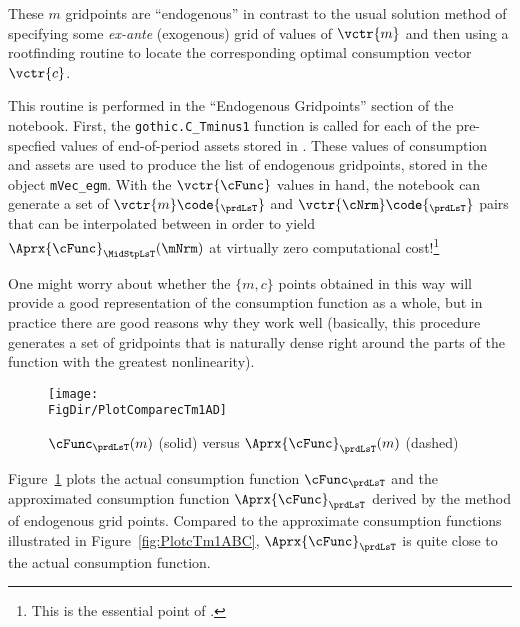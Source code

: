 \documentclass[\econtexRoot/SolvingMicroDSOPs]{subfiles}
\begin{document}

These $m$ gridpoints are ``endogenous'' in contrast to the usual solution method of specifying some \textit{ex-ante} (exogenous) grid of values of $\vctr{m}$ and then using a rootfinding routine to locate the corresponding optimal consumption vector $\vctr{c}$.


This routine is performed in the ``Endogenous Gridpoints'' section of the notebook. First, the \texttt{gothic.C\_Tminus1} function is called for each of the pre-specfied values of end-of-period assets stored in . These values of consumption and assets are used to produce the list of endogenous gridpoints, stored in the object \texttt{mVec\_egm}. With the $\vctr{\cFunc}$ values in hand, the notebook can generate a set of $\vctr{m}\code{_{\prdLsT}}$ and ${\vctr{\cNrm}\code{_{\prdLsT}}}$ pairs that can be interpolated between in order to yield $\Aprx{\cFunc}_{\MidStpLsT}(\mNrm)$ at virtually zero computational cost!\footnote{This is the essential point of \cite{carrollEGM}.} %

\hypertarget{PlotComparecTm1AD}{}
One might worry about whether the $\{{m},c\}$ points obtained in this way will provide a good representation of the consumption function as a whole, but in practice there are good reasons why they work well (basically, this procedure generates a set of gridpoints that is naturally dense right around the parts of the function with the greatest nonlinearity).
\begin{figure}
  \centerline{\texttt{[image: \\FigDir/PlotComparecTm1AD]}}
  \caption{$\cFunc_{\prdLsT}(m)$ (solid) versus $\Aprx{\cFunc}_{\prdLsT}(m)$ (dashed)}
  \label{fig:ComparecTm1AD}
\end{figure}
Figure~\ref{fig:ComparecTm1AD} plots the actual consumption function $\cFunc_{\prdLsT}$ and the approximated consumption function $\Aprx{\cFunc}_{\prdLsT}$ derived by the method of endogenous grid points. Compared to the approximate consumption functions illustrated in Figure~\ref{fig:PlotcTm1ABC}, $\Aprx{\cFunc}_{\prdLsT}$ is quite close to the actual consumption function.
\end{document}
